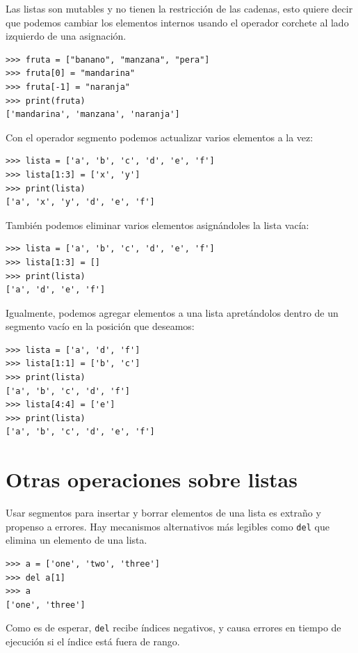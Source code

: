  

Las listas son mutables y no tienen la restricción de las cadenas,
esto quiere decir que podemos cambiar los elementos internos usando
el operador corchete al lado izquierdo de una asignación.
\begin{lstlisting}
>>> fruta = ["banano", "manzana", "pera"]
>>> fruta[0] = "mandarina"
>>> fruta[-1] = "naranja"
>>> print(fruta)
['mandarina', 'manzana', 'naranja']
\end{lstlisting}
 Con el operador segmento podemos actualizar varios elementos a la
vez:
\begin{lstlisting}
>>> lista = ['a', 'b', 'c', 'd', 'e', 'f']
>>> lista[1:3] = ['x', 'y']
>>> print(lista)
['a', 'x', 'y', 'd', 'e', 'f']
\end{lstlisting}
También podemos eliminar varios elementos asignándoles la lista vacía:
\begin{lstlisting}
>>> lista = ['a', 'b', 'c', 'd', 'e', 'f']
>>> lista[1:3] = []
>>> print(lista)
['a', 'd', 'e', 'f']
\end{lstlisting}
Igualmente, podemos agregar elementos a una lista apretándolos dentro
de un segmento vacío en la posición que deseamos:
\begin{lstlisting}
>>> lista = ['a', 'd', 'f']
>>> lista[1:1] = ['b', 'c']
>>> print(lista)
['a', 'b', 'c', 'd', 'f']
>>> lista[4:4] = ['e']
>>> print(lista)
['a', 'b', 'c', 'd', 'e', 'f']
\end{lstlisting}
\section{Otras operaciones sobre listas}


Usar segmentos para insertar y borrar elementos de una lista es extraño
y propenso a errores. Hay mecanismos alternativos más legibles como
\texttt{del} que elimina un elemento de una lista.

  
\begin{lstlisting}
>>> a = ['one', 'two', 'three']
>>> del a[1]
>>> a
['one', 'three']
\end{lstlisting}
Como es de esperar, \texttt{del} recibe índices negativos, y causa
errores en tiempo de ejecución si el índice está fuera de rango.

